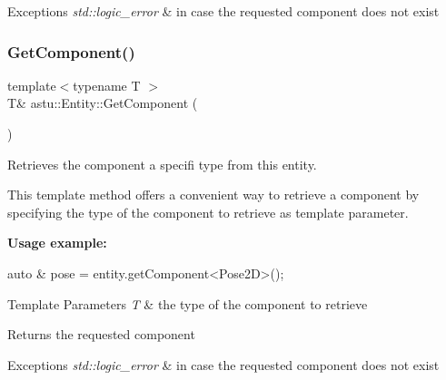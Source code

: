 \begin{DoxyExceptions}{Exceptions}
{\em std\+::logic\+\_\+error} & in case the requested component does not exist \\
\hline
\end{DoxyExceptions}
\mbox{\label{classastu_1_1Entity_aeabb500a719de29039dd0fad4ea553c4}} 
\subsubsection{\texorpdfstring{Get\+Component()}{GetComponent()}\hspace{0.1cm}{\footnotesize\ttfamily [3/3]}}
{\footnotesize\ttfamily template$<$typename T $>$ \\
T\& astu\+::\+Entity\+::\+Get\+Component (\begin{DoxyParamCaption}{ }\end{DoxyParamCaption})\hspace{0.3cm}{\ttfamily [inline]}}

Retrieves the component a specifi type from this entity.

This template method offers a convenient way to retrieve a component by specifying the type of the component to retrieve as template parameter.

{\bfseries Usage example\+:} 
\begin{DoxyCode}
\textcolor{keyword}{auto} & pose = entity.getComponent<Pose2D>();
\end{DoxyCode}



\begin{DoxyTemplParams}{Template Parameters}
{\em T} & the type of the component to retrieve \\
\hline
\end{DoxyTemplParams}
\begin{DoxyReturn}{Returns}
the requested component 
\end{DoxyReturn}

\begin{DoxyExceptions}{Exceptions}
{\em std\+::logic\+\_\+error} & in case the requested component does not exist \\
\hline
\end{DoxyExceptions}
\mbox{\label{classastu_1_1Entity_ad1ee4a4e617de7c40eb252413b9045a1}} 
